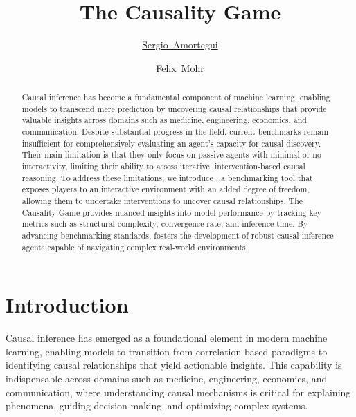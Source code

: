 \documentclass{uai2024} %
\title{The Causality Game}
\author[1]{\href{mailto:<sergio.amortegui@example.com>?Subject=Your UAI 2024 paper}{Sergio~Amortegui}{}}
\author[1]{\href{mailto:<felix.mohr@example.com>?Subject=Your UAI 2024 paper}{Felix~Mohr}{}}
\affil[1]{%
    Faculty of Engineering\\
    Universidad de La Sabana\\
    Chía, Colombia
}
\begin{document}
\maketitle







\begin{abstract}
    Causal inference has become a fundamental component of machine learning, enabling models to transcend mere prediction by uncovering causal relationships that provide valuable insights across domains such as medicine, engineering, economics, and communication. 
    Despite substantial progress in the field, current benchmarks remain insufficient for comprehensively evaluating an agent’s capacity for causal discovery. 
    Their main limitation is that they only focus on passive agents with minimal or no interactivity, limiting their ability to assess iterative, intervention-based causal reasoning.
    To address these limitations, we introduce \game, a benchmarking tool that exposes players to an interactive environment with an added degree of freedom, allowing them to undertake interventions to uncover causal relationships. 
    The Causality Game provides nuanced insights into model performance by tracking key metrics such as structural complexity, convergence rate, and inference time. 
    By advancing benchmarking standards, \game fosters the development of robust causal inference agents capable of navigating complex real-world environments.
\end{abstract}







\section{Introduction}
    Causal inference has emerged as a foundational element in modern machine learning, enabling models to transition from correlation-based paradigms to identifying causal relationships that yield actionable insights. 
    This capability is indispensable across domains such as medicine, engineering, economics, and communication, where understanding causal mechanisms is critical for explaining phenomena, guiding decision-making, and optimizing complex systems.
\end{document}
